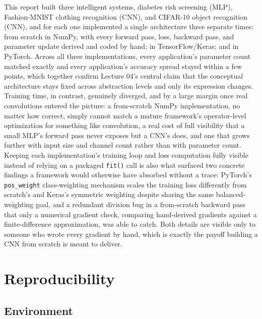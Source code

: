 \documentclass[11pt]{article}
\newcommand{\code}[1]{\texttt{#1}}
\begin{document}
This report built three intelligent systems, diabetes risk screening (MLP),
Fashion-MNIST clothing recognition (CNN), and CIFAR-10 object recognition
(CNN), and for each one implemented a single architecture three separate
times: from scratch in NumPy, with every forward pass, loss, backward pass,
and parameter update derived and coded by hand; in TensorFlow/Keras; and in
PyTorch. Across all three implementations, every application's parameter
count matched exactly and every application's accuracy spread stayed within
a few points, which together confirm Lecture 04's central claim that the
conceptual architecture stays fixed across abstraction levels and only its
expression changes. Training time, in contrast, genuinely diverged, and by a
large margin once real convolutions entered the picture: a from-scratch
NumPy implementation, no matter how correct, simply cannot match a mature
framework's operator-level optimization for something like convolution, a
real cost of full visibility that a small MLP's forward pass never exposes
but a CNN's does, and one that grows further with input size and channel
count rather than with parameter count. Keeping each implementation's
training loop and loss computation fully visible instead of relying on a
packaged \code{fit()} call is also what surfaced two concrete findings a
framework would otherwise have absorbed without a trace: PyTorch's
\code{pos\_weight} class-weighting mechanism scales the training loss
differently from scratch's and Keras's symmetric weighting despite sharing
the same balanced-weighting goal, and a redundant division bug in a
from-scratch backward pass that only a numerical gradient check, comparing
hand-derived gradients against a finite-difference approximation, was able to
catch. Both details are visible only to someone who wrote every gradient by
hand, which is exactly the payoff building a CNN from scratch is meant to
deliver.

\section{Reproducibility}

\subsection{Environment}
\end{document}
